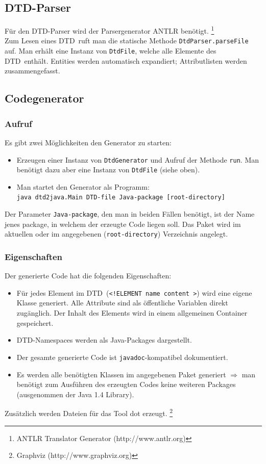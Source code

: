 \documentclass [a4paper,12pt] {scrartcl}
\newcommand{\DTD}{{\sffamily\small DTD}}
\begin{document}
\subsection{DTD-Parser}
F{\"u}r den \DTD-Parser wird der Parsergenerator \textsf{ANTLR} ben{\"o}tigt.
\footnote{ANTLR Translator Generator (http://www.antlr.org)}\\
Zum Lesen eines \DTD\ ruft man die statische Methode \texttt{DtdParser.parseFile} auf.
Man erh{\"a}lt eine Instanz von \texttt{DtdFile}, welche alle Elemente des \DTD\ enth{\"a}lt.
Entities werden automatisch expandiert; Attributlisten werden zusammengefasst.

\subsection{Codegenerator}
\subsubsection{Aufruf}
Es gibt zwei M{\"o}glichkeiten den Generator zu starten:
\begin{itemize}
\item Erzeugen einer Instanz von \texttt{DtdGenerator} und Aufruf der Methode \texttt{run}.
    Man ben{\"o}tigt dazu aber eine Instanz von \texttt{DtdFile} (siehe oben).
\item Man startet den Generator als Programm:\\
    \texttt{java dtd2java.Main \DTD-file Java-package [root-directory]}
\end{itemize}
Der Parameter \texttt{Java-package}, den man in beiden F{\"a}llen ben{\"o}tigt, ist der Name
jenes package, in welchem der erzeugte Code liegen soll. Das Paket wird im aktuellen
oder im angegebenen (\texttt{root-directory})
Verzeichnis angelegt.
\subsubsection{Eigenschaften}
Der generierte Code hat die folgenden Eigenschaften:
\begin{itemize}
\item F{\"u}r jedes Element im \DTD\ (\texttt{<!ELEMENT name content >})
    wird eine eigene Klasse generiert. Alle Attribute sind als {\"o}ffentliche Variablen
    direkt zug{\"a}nglich. Der Inhalt des Elements wird in einem allgemeinen Container gespeichert.
\item \DTD-Namespaces werden als Java-Packages dargestellt.
\item Der gesamte generierte Code ist \texttt{javadoc}-kompatibel dokumentiert.
\item Es werden alle ben{\"o}tigten Klassen im angegebenen Paket generiert
    $\Rightarrow$ man ben{\"o}tigt zum Ausf{\"u}hren des erzeugten Codes keine
    weiteren Packages (ausgenommen der Java 1.4 Library).
\end{itemize}
Zus{\"a}tzlich werden Dateien f{\"u}r das Tool \textsf{dot} erzeugt.
\footnote{Graphviz (http://www.graphviz.org)}
\end{document}
